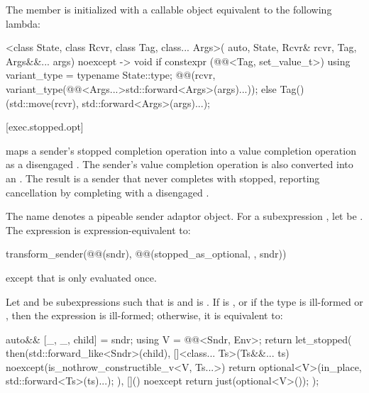 \pnum
The member 
is initialized with a callable object equivalent to the following lambda:
\begin{codeblock}
[]<class State, class Rcvr, class Tag, class... Args>(
    auto, State, Rcvr& rcvr, Tag, Args&&... args) noexcept -> void {
  if constexpr (@@<Tag, set_value_t>) {
    using variant_type = typename State::type;
    @@(rcvr, variant_type(@@<Args...>{std::forward<Args>(args)...}));
  } else {
    Tag()(std::move(rcvr), std::forward<Args>(args)...);
  }
}
\end{codeblock}

[exec.stopped.opt]{}

\pnum
{} maps a sender's stopped completion operation
into a value completion operation as a disengaged .
The sender's value completion operation
is also converted into an .
The result is a sender that never completes with stopped,
reporting cancellation by completing with a disengaged .

\pnum
The name  denotes a pipeable sender adaptor object.
For a subexpression , let  be .
The expression  is expression-equivalent to:
\begin{codeblock}
transform_sender(@@(sndr), @@(stopped_as_optional, {}, sndr))
\end{codeblock}
except that  is only evaluated once.

\pnum
Let  and  be subexpressions
such that  is  and
 is .
If 
is , or
if the type 
is ill-formed or ,
then the expression 
is ill-formed;
otherwise, it is equivalent to:
\begin{codeblock}
auto&& [_, _, child] = sndr;
using V = @@<Sndr, Env>;
return let_stopped(
    then(std::forward_like<Sndr>(child),
         []<class... Ts>(Ts&&... ts) noexcept(is_nothrow_constructible_v<V, Ts...>) {
           return optional<V>(in_place, std::forward<Ts>(ts)...);
         }),
    []() noexcept { return just(optional<V>()); });
\end{codeblock}

